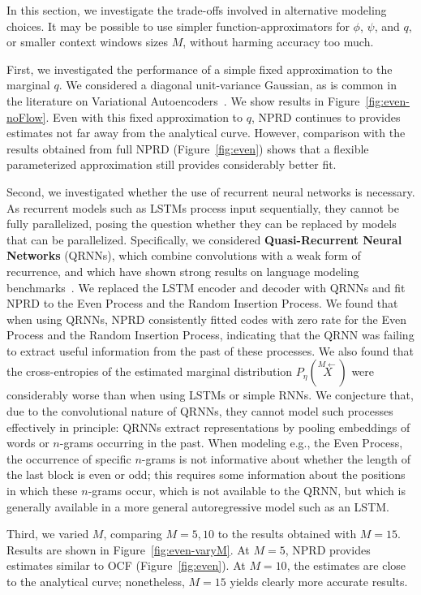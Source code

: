 \documentclass[entropy,article,submit,moreauthors,pdftex,10pt,a4paper]{Definitions/mdpi}
\newcommand{\key}{\textbf}
\newcommand{\finitepast}{\stackrel{\scriptscriptstyle{M}\leftarrow}{X}}%
\begin{document}
In this section, we investigate the trade-offs involved in alternative modeling choices. It may be possible to use simpler function-approximators for $\phi$, $\psi$, and $q$, or smaller context windows sizes $M$, without harming accuracy too much.

First, we investigated the performance of a simple fixed approximation to the marginal $q$.
We considered a diagonal unit-variance Gaussian, as is common in the literature on Variational Autoencoders~\citep{kingma-auto-encoding-2014}.
We show results in Figure~\ref{fig:even-noFlow}.
Even with this fixed approximation to $q$, NPRD continues to provides estimates not far away from the analytical curve.
However, comparison with the results obtained from full NPRD (Figure~\ref{fig:even}) shows that a flexible parameterized approximation still provides considerably better fit.

Second, we investigated whether the use of recurrent neural networks is necessary.
As recurrent models such as LSTMs process input sequentially, they cannot be fully parallelized, posing the question whether they can be replaced by models that can be parallelized.
Specifically, we considered \key{Quasi-Recurrent Neural Networks} (QRNNs), which combine convolutions with a weak form of recurrence, and which have shown strong results on language modeling benchmarks~\citep{bradbury2017quasi}.
We replaced the LSTM encoder and decoder with QRNNs and fit NPRD to the Even Process and the Random Insertion Process.
We found that when using QRNNs, NPRD consistently fitted codes with zero rate for the Even Process and the Random Insertion Process, indicating that the QRNN was failing to extract useful information from the past of these processes.
We also found that the cross-entropies of the estimated marginal distribution $P_\eta(\finitepast)$ were considerably worse than when using LSTMs or simple RNNs.
We conjecture that, due to the convolutional nature of QRNNs, they cannot model such processes effectively in principle:
QRNNs extract representations by pooling embeddings of words or $n$-grams occurring in the past.
When modeling e.g., the Even Process, the occurrence of specific $n$-grams is not informative about whether the length of the last block is even or odd; this requires some information about the positions in which these $n$-grams occur, which is not available to the QRNN, but which is generally available in a more general autoregressive model such as an LSTM.

Third, we varied $M$, comparing $M=5, 10$ to the results obtained with $M=15$. 
Results are shown in Figure~\ref{fig:even-varyM}.
At $M=5$, NPRD provides estimates similar to OCF (Figure~\ref{fig:even}).
At $M=10$, the estimates are close to the analytical curve; nonetheless, $M=15$ yields clearly more accurate results.
\end{document}

